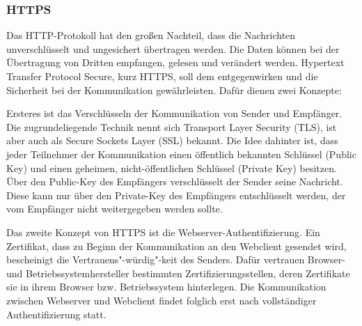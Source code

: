 \subsubsection{HTTPS}
Das HTTP-Protokoll hat den großen Nachteil, dass die Nachrichten unverschlüsselt und ungesichert übertragen werden. 
Die Daten können bei der Übertragung von Dritten empfangen, gelesen und verändert werden. Hypertext Transfer Protocol Secure, kurz HTTPS, soll dem entgegenwirken und die Sicherheit bei der Kommunikation gewährleisten. 
Dafür dienen zwei Konzepte:
\newline

\noindent
\noindent
Ersteres ist das Verschlüsseln der Kommunikation von Sender und Empfänger. Die zugrundeliegende Technik nennt sich Transport Layer Security (TLS), ist aber auch als Secure Sockets Layer (SSL) bekannt. Die Idee dahinter ist, dass jeder Teilnehmer der Kommunikation einen öffentlich bekannten Schlüssel (Public Key) und einen geheimen, nicht-öffentlichen Schlüssel (Private Key) besitzen. Über den Public-Key des Empfängers verschlüsselt der Sender seine Nachricht. Diese kann nur über den Private-Key des Empfängers entschlüsselt werden, der vom Empfänger nicht weitergegeben werden sollte.
\newline

\noindent
Das zweite Konzept von HTTPS ist die Webserver-Authentifizierung. Ein Zertifikat, dass zu Beginn der Kommunikation an den Webclient gesendet wird, bescheinigt die Vertrauens"-würdig"-keit des Senders. Dafür vertrauen Browser- und Betriebssystemhersteller bestimmten Zertifizierungsstellen, deren Zertifikate sie in ihrem Browser bzw. Betriebssystem hinterlegen. Die Kommunikation zwischen Webserver und Webclient findet folglich erst nach vollständiger Authentifizierung statt.
